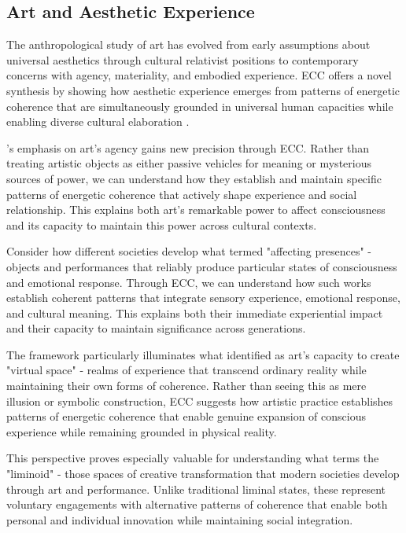 \subsection{Art and Aesthetic Experience}

The anthropological study of art has evolved from early assumptions about universal aesthetics through cultural relativist positions to contemporary concerns with agency, materiality, and embodied experience. ECC offers a novel synthesis by showing how aesthetic experience emerges from patterns of energetic coherence that are simultaneously grounded in universal human capacities while enabling diverse cultural elaboration \cite{gell1998art}.

\cite{armstrong1971affecting}'s emphasis on art's agency gains new precision through ECC. Rather than treating artistic objects as either passive vehicles for meaning or mysterious sources of power, we can understand how they establish and maintain specific patterns of energetic coherence that actively shape experience and social relationship. This explains both art's remarkable power to affect consciousness and its capacity to maintain this power across cultural contexts.

Consider how different societies develop what \cite{armstrong1971affecting} termed "affecting presences" - objects and performances that reliably produce particular states of consciousness and emotional response. Through ECC, we can understand how such works establish coherent patterns that integrate sensory experience, emotional response, and cultural meaning. This explains both their immediate experiential impact and their capacity to maintain significance across generations.

The framework particularly illuminates what \cite{langer1953feeling} identified as art's capacity to create "virtual space" - realms of experience that transcend ordinary reality while maintaining their own forms of coherence. Rather than seeing this as mere illusion or symbolic construction, ECC suggests how artistic practice establishes patterns of energetic coherence that enable genuine expansion of conscious experience while remaining grounded in physical reality.

This perspective proves especially valuable for understanding what \cite{turner1982ritual} terms the "liminoid" - those spaces of creative transformation that modern societies develop through art and performance. Unlike traditional liminal states, these represent voluntary engagements with alternative patterns of coherence that enable both personal and individual innovation while maintaining social integration.

